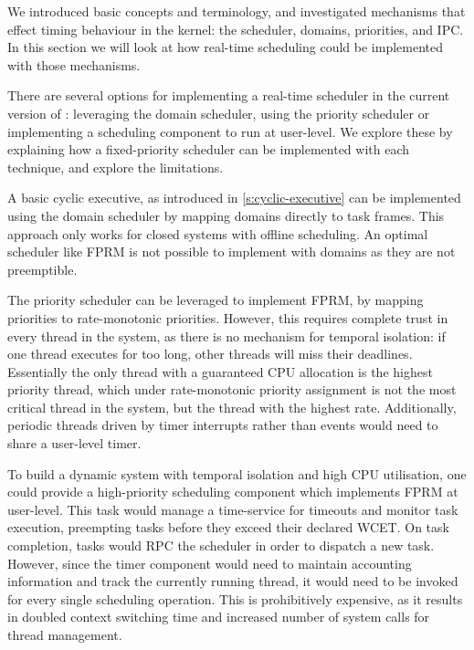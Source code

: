 We introduced basic \selfour concepts and terminology, and investigated mechanisms that effect
timing behaviour in the kernel: the scheduler, domains, priorities,  and IPC. 
In this section we will look at how real-time scheduling could be implemented with those mechanisms.

There are several options for implementing a real-time scheduler in the current version of \selfour:
leveraging the domain scheduler, using the priority scheduler or implementing a scheduling component
to run at user-level. We explore these by explaining how a fixed-priority scheduler can be
implemented with each technique, and explore the limitations. 

A basic cyclic executive, as introduced in \cref{s:cyclic-executive} can be implemented using the
domain scheduler by mapping domains directly to task frames. This approach only works for closed
systems with offline scheduling. An optimal scheduler like \gls{FPRM} is not possible to implement
with domains as they are not preemptible. 

The priority scheduler can be leveraged to implement \gls{FPRM}, by mapping \selfour priorities to 
rate-monotonic priorities. 
However, this requires complete trust in every thread in the system, as there is no mechanism for
temporal isolation: if one thread executes for too long, other threads will miss their deadlines.
Essentially the only thread with a guaranteed CPU allocation is the highest priority thread, which
under rate-monotonic priority assignment is not the most critical thread in the system, but the
thread with the highest rate.  Additionally, periodic threads driven by timer interrupts rather than
events would need to share a user-level timer.

To build a dynamic system with temporal isolation and high CPU utilisation, one could provide a 
high-priority scheduling component which implements \gls{FPRM} at user-level. This task would manage a
time-service for timeouts and monitor task execution, preempting tasks before they exceed their
declared \gls{WCET}. On task completion, tasks would RPC the scheduler in order to dispatch
a new task.
However, since the timer component would need to maintain accounting information and track the currently running thread, it would need to be invoked for every single scheduling operation.
This is prohibitively expensive, as it results in doubled context switching time and increased number of system calls for thread management.

